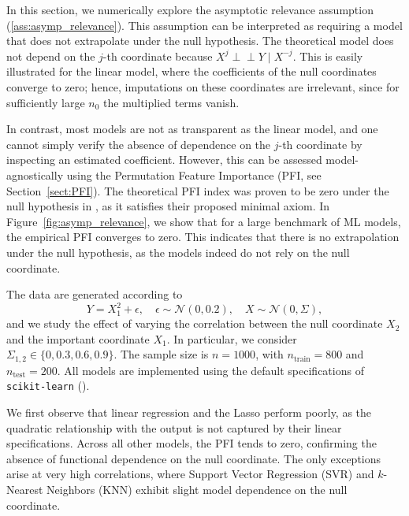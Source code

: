 \documentclass{article}
\theoremstyle{plain}
\theoremstyle{definition}
\theoremstyle{remark}
\newcommand{\indep}{\perp\!\!\!\perp}
\begin{document}
In this section, we numerically explore the asymptotic relevance assumption (\ref{ass:asymp_relevance}). This assumption can be interpreted as requiring a model that does not extrapolate under the null hypothesis. The theoretical model does not depend on the $j$-th coordinate because $X^j \indep Y \mid X^{-j}$. This is easily illustrated for the linear model, where the coefficients of the null coordinates converge to zero; hence, imputations on these coordinates are irrelevant, since for sufficiently large $n_0$ the multiplied terms vanish. 

In contrast, most models are not as transparent as the linear model, and one cannot simply verify the absence of dependence on the $j$-th coordinate by inspecting an estimated coefficient. However, this can be assessed model-agnostically using the Permutation Feature Importance (PFI, see Section~\ref{sect:PFI}). The theoretical PFI index was proven to be zero under the null hypothesis in \citet{reyerolobo2025principledapproachcomparingvariable}, as it satisfies their proposed minimal axiom. In Figure~\ref{fig:asymp_relevance}, we show that for a large benchmark of ML models, the empirical PFI converges to zero. This indicates that there is no extrapolation under the null hypothesis, as the models indeed do not rely on the null coordinate.

The data are generated according to
\[
Y = X_1^2 + \epsilon, 
\quad \epsilon \sim \mathcal{N}(0,0.2), 
\quad X \sim \mathcal{N}(0,\Sigma),
\]
and we study the effect of varying the correlation between the null coordinate $X_2$ and the important coordinate $X_1$. In particular, we consider $\Sigma_{1,2} \in \{0, 0.3, 0.6, 0.9\}$. The sample size is $n=1000$, with $n_\mathrm{train}=800$ and $n_\mathrm{test}=200$. All models are implemented using the default specifications of \texttt{scikit-learn} (\cite{scikit-learn}). 

We first observe that linear regression and the Lasso perform poorly, as the quadratic relationship with the output is not captured by their linear specifications. Across all other models, the PFI tends to zero, confirming the absence of functional dependence on the null coordinate. The only exceptions arise at very high correlations, where Support Vector Regression (SVR) and $k$-Nearest Neighbors (KNN) exhibit slight model dependence on the null coordinate.
\end{document}
